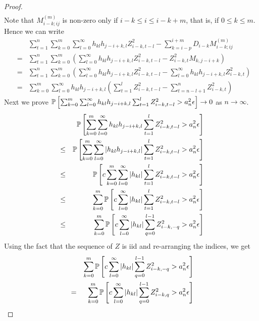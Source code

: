 \documentclass{article}
\begin{document}
\begin{proof}
\begin{eqnarray*}
  \end{eqnarray*}
  Note that $M_{i-k; ij}^{(m)}$ is non-zero only if $i-k \leq i \leq
  i-k+m$, that is, if $0 \leq k \leq m$. Hence we can write
  \begin{eqnarray*}
    && \sum_{t=1}^n \sum_{k=0}^m \sum_{l=0}^\infty h_{kl}h_{j-i+k,l}
    Z_{i-k, t-l}^2 - \sum_{k=i-p}^{i+m} D_{i-k} M_{i-k; ij}^{(m)} \\
    &=& \sum_{t=1}^n \sum_{k=0}^m \left(
      \sum_{l=0}^\infty h_{kl}h_{j-i+k,l} Z_{i-k, t-l}^2 - Z_{i-k, t}^2 M_{k,
        j-i+k} \right) \\
    &=& \sum_{t=1}^n \sum_{k=0}^m \left(
      \sum_{l=0}^\infty h_{kl}h_{j-i+k,l} Z_{i-k, t-l}^2 - \sum_{l=0}^{\infty}
      h_{kl} h_{j-i+k, l} Z_{i-k, t}^2  \right) \\
    &=& \sum_{k=0}^m \sum_{l=0}^\infty h_{kl} h_{j-i+k, l}\left(
      \sum_{t=1}^l Z_{i-k, t-l}^2 - \sum_{t=n-l+1}^n Z_{i-k, t}^2
    \right)
  \end{eqnarray*}
  Next we prove $\mathbb{P}\left[\sum_{k=0}^m \sum_{l=0}^\infty h_{kl} h_{j-i+k, l}
    \sum_{t=1}^l Z_{i-k, t-l}^2 > a_n^2 \epsilon \right] \to 0$ as
  $n \to \infty$.
  \begin{eqnarray*}
    && \mathbb{P}\left[\sum_{k=0}^m \sum_{l=0}^\infty h_{kl} h_{j-i+k, l}
      \sum_{t=1}^l Z_{i-k, t-l}^2 > a_n^2 \epsilon \right] \\
    &\leq& \mathbb{P}\left[\sum_{k=0}^m \sum_{l=0}^\infty | h_{kl} h_{j-i+k,
        l} | \sum_{t=1}^l Z_{i-k, t-l}^2 > a_n^2 \epsilon \right] \\
    &\leq& \mathbb{P}\left[c \sum_{k=0}^m \sum_{l=0}^\infty | h_{kl} |
      \sum_{t=1}^l Z_{i-k, t-l}^2 > a_n^2 \epsilon \right] \\
    &\leq& \sum_{k=0}^m \mathbb{P}\left[c \sum_{l=0}^\infty | h_{kl} |
      \sum_{t=1}^l Z_{i-k, t-l}^2 > a_n^2 \epsilon \right] \\
    &\leq& \sum_{k=0}^m \mathbb{P}\left[c \sum_{l=0}^\infty | h_{kl} |
      \sum_{q=0}^{l-1} Z_{i-k, -q}^2 > a_n^2 \epsilon \right] \\
  \end{eqnarray*}
  Using the fact that the sequence of $Z$ is iid and re-arranging the
  indices, we get
  \begin{eqnarray*}
    && \sum_{k=0}^m \pr\left[c \sum_{l=0}^\infty | h_{kl} |
      \sum_{q=0}^{l-1} Z_{i-k, -q}^2 > a_n^2 \epsilon \right] \\
    &=& \sum_{k=0}^m \pr\left[c \sum_{l=0}^\infty | h_{kl} |
      \sum_{q=0}^{l-1} Z_{i-k, q}^2 > a_n^2 \epsilon \right] \\

\end{eqnarray*}
\end{proof}
\end{document}

